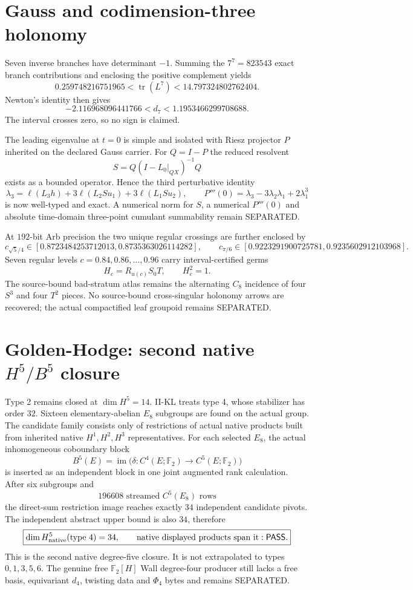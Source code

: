\documentclass[10pt,a4paper]{article}
\newcommand{\PASS}{\textsf{PASS}}\newcommand{\ZERO}{\textsf{ZERO}}\newcommand{\SEP}{\textsf{SEPARATED}}\newcommand{\REF}{\textsf{REFUTED}}\newcommand{\NT}{\textsf{NT}}
\begin{document}
\section{Gauss and codimension-three holonomy}
Seven inverse branches have determinant $-1$.  Summing the $7^7=823543$ exact branch contributions and enclosing the positive complement yields
\[
\boxed{0.259748216751965<\operatorname{tr}(L^7)<14.797324802762404}.
\]
Newton's identity then gives
\[
\boxed{-2.116968096441766<d_7<1.1953466299708688}.
\]
The interval crosses zero, so no sign is claimed.

The leading eigenvalue at $t=0$ is simple and isolated with Riesz projector $P$ inherited on the declared Gauss carrier.  For $Q=I-P$ the reduced resolvent
\[
\boxed{S=Q(I-L_0\vert_{QX})^{-1}Q}
\]
exists as a bounded operator.  Hence the third perturbative identity
\[
\lambda_3=\ell(L_3h)+3\ell(L_2Su_1)+3\ell(L_1Su_2),\qquad
P'''(0)=\lambda_3-3\lambda_2\lambda_1+2\lambda_1^3
\]
is now well-typed and exact.  A numerical norm for $S$, a numerical $P'''(0)$ and absolute time-domain three-point cumulant summability remain \SEP.

At $192$-bit Arb precision the two unique regular crossings are further enclosed by
\[
\boxed{c_{\sqrt5/4}\in[0.8723484253712013,0.8735363026114282]},\qquad
\boxed{c_{\pi/6}\in[0.9223291900725781,0.9235602912103968]}.
\]
Seven regular levels $c=0.84,0.86,\ldots,0.96$ carry interval-certified germs
\[
H_c=R_{u(c)}S_0T,\qquad H_c^2=1.
\]
The source-bound bad-stratum atlas remains the alternating $C_8$ incidence of four $S^3$ and four $T^2$ pieces.  No source-bound cross-singular holonomy arrows are recovered; the actual compactified leaf groupoid remains \SEP.

\section{Golden-Hodge: second native $H^5/B^5$ closure}
Type 2 remains closed at $\dim H^5=14$.  II-KL treats type 4, whose stabilizer has order $32$.  Sixteen elementary-abelian $E_8$ subgroups are found on the actual group.  The candidate family consists only of restrictions of actual native products built from inherited native $H^1,H^2,H^3$ representatives.  For each selected $E_8$, the actual inhomogeneous coboundary block
\[
B^5(E)=\operatorname{im}\bigl(\delta:C^4(E;\mathbb F_2)\to C^5(E;\mathbb F_2)\bigr)
\]
is inserted as an independent block in one joint augmented rank calculation.  After six subgroups and
\[
\boxed{196608\text{ streamed }C^5(E_8)\text{ rows}}
\]
the direct-sum restriction image reaches exactly $34$ independent candidate pivots.  The independent abstract upper bound is also $34$, therefore
\[
\boxed{\dim H^5_{\rm native}(\text{type }4)=34,\qquad\text{native displayed products span it}:\PASS.}
\]
This is the second native degree-five closure.  It is not extrapolated to types $0,1,3,5,6$.  The genuine free $\mathbb F_2[H]$ Wall degree-four producer still lacks a free basis, equivariant $d_4$, twisting data and $\Phi_4$ bytes and remains \SEP.
\end{document}
